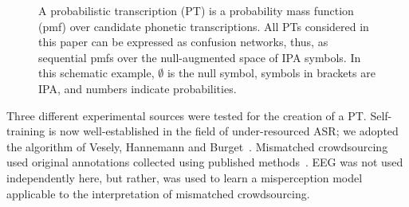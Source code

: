 \begin{figure}
\begin{center}
\end{center}
\vspace*{-2mm}
\caption{A probabilistic transcription (PT) is a probability mass
  function (pmf) over candidate phonetic transcriptions.  All PTs
  considered in this paper can be expressed as confusion networks,
  thus, as sequential pmfs over the null-augmented space of IPA
  symbols.  In this schematic example, $\emptyset$ is the null
  symbol, symbols in brackets are IPA, and numbers indicate
  probabilities.}
  \label{fig:pt}
\end{figure}

Three different experimental sources were tested for the creation of a
PT.  Self-training is now well-established in the field of
under-resourced ASR; we adopted the algorithm of Vesely, Hannemann and
Burget~\cite{vesely2013-semi}.  Mismatched crowdsourcing used original
annotations collected using published methods~\cite{JHJ15b}.  EEG was
not used independently here, but rather, was used to learn a
misperception model applicable to the interpretation of mismatched
crowdsourcing.
